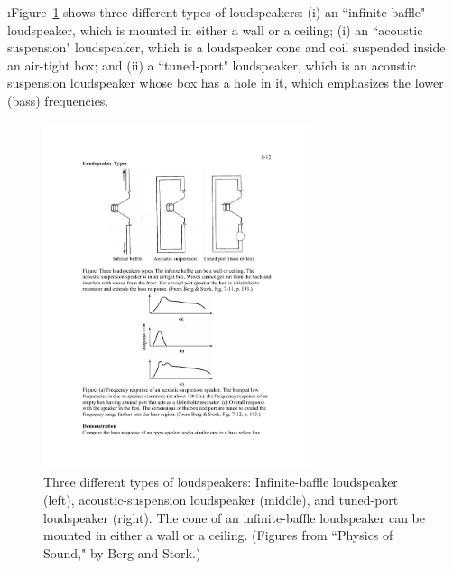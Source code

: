 \i Figure~\ref{f:loudspeaker_types} shows three different types
of loudspeakers:
(i) an ``infinite-baffle" loudspeaker, which is mounted in
either a wall or a ceiling;
(i) an ``acoustic suspension" loudspeaker, which is 
a loudspeaker cone and coil suspended inside an air-tight box; and 
(ii) a ``tuned-port" loudspeaker, which is an acoustic
suspension loudspeaker whose box has a hole in it, which 
emphasizes the lower (bass) frequencies.
%
\begin{figure}[htbp]
\begin{center}
\includegraphics[width=0.7\textwidth]{loudspeaker_types}
\caption{Three different types of loudspeakers:
Infinite-baffle loudspeaker (left), 
acoustic-suspension loudspeaker (middle), and 
tuned-port loudspeaker (right).
The cone of an infinite-baffle loudspeaker can be mounted in either
a wall or a ceiling.
(Figures from ``Physics of Sound," by Berg and Stork.)} 
\label{f:loudspeaker_types}
\end{center}
\end{figure}
%

